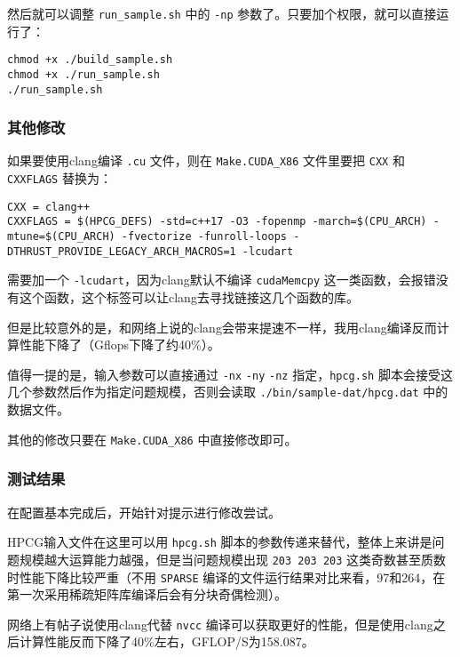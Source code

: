 \documentclass[a4paper,12pt,scheme=plain]{ctexart}
\newcommand{\inlinecode}[1]{\colorbox{gray!10}{\lstinline|#1|}}
\numberwithin{equation}{section} %
\begin{document}
然后就可以调整 \inlinecode{run_sample.sh} 中的 \inlinecode{-np} 参数了。只要加个权限，就可以直接运行了：

\begin{lstlisting}[style=bash]
chmod +x ./build_sample.sh
chmod +x ./run_sample.sh
./run_sample.sh
\end{lstlisting}

\subsubsection{其他修改}

如果要使用clang编译 \inlinecode{.cu} 文件，则在 \inlinecode{Make.CUDA_X86} 文件里要把 \inlinecode{CXX} 和 \inlinecode{CXXFLAGS} 替换为：

\begin{lstlisting}[style=bash]
CXX = clang++
CXXFLAGS = $(HPCG_DEFS) -std=c++17 -O3 -fopenmp -march=$(CPU_ARCH) -mtune=$(CPU_ARCH) -fvectorize -funroll-loops -DTHRUST_PROVIDE_LEGACY_ARCH_MACROS=1 -lcudart
\end{lstlisting}

需要加一个 \inlinecode{-lcudart}，因为clang默认不编译 \inlinecode{cudaMemcpy} 这一类函数，会报错没有这个函数，这个标签可以让clang去寻找链接这几个函数的库。

但是比较意外的是，和网络上说的clang会带来提速不一样，我用clang编译反而计算性能下降了（Gflops下降了约40\%）。

值得一提的是，输入参数可以直接通过 \inlinecode{-nx} \inlinecode{-ny} \inlinecode{-nz} 指定，\inlinecode{hpcg.sh} 脚本会接受这几个参数然后作为指定问题规模，否则会读取 \inlinecode{./bin/sample-dat/hpcg.dat} 中的数据文件。

其他的修改只要在 \inlinecode{Make.CUDA_X86} 中直接修改即可。

\subsubsection{测试结果}

在配置基本完成后，开始针对提示进行修改尝试。

HPCG输入文件在这里可以用 \inlinecode{hpcg.sh} 脚本的参数传递来替代，整体上来讲是问题规模越大运算能力越强，但是当问题规模出现 \inlinecode{203 203 203} 这类奇数甚至质数时性能下降比较严重（不用 \inlinecode{SPARSE} 编译的文件运行结果对比来看，97和264，在第一次采用稀疏矩阵库编译后会有分块奇偶检测）。

网络上有帖子说使用clang代替 \inlinecode{nvcc} 编译可以获取更好的性能，但是使用clang之后计算性能反而下降了40\%左右，GFLOP/S为158.087。
\end{document}
